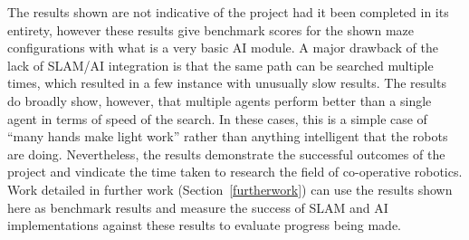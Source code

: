 The results shown are not indicative of the project had it been completed in its 
entirety, however these results give benchmark scores for the shown maze 
configurations with what is a very basic AI module. A major drawback of the lack of SLAM/AI
integration is that the same path can be searched multiple times, which resulted in a few
instance with unusually slow results. The results do broadly show, however, 
that multiple agents perform better than a single agent in terms of speed of 
the search. In these cases, this is a simple case of ``many hands make light 
work'' rather than anything intelligent that the robots are doing. 
Nevertheless, the results demonstrate the successful outcomes of the project 
and vindicate the time taken to research the field of co-operative robotics.
Work detailed in further work (Section~\ref{furtherwork}) can use the
results shown here as benchmark results and
measure the success of SLAM and AI implementations against these results to
evaluate progress being made.
